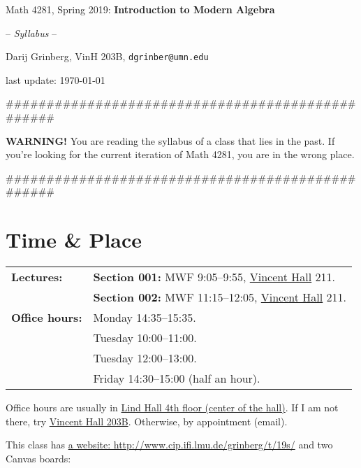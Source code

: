 \documentclass[numbers=enddot,12pt,final,onecolumn,notitlepage]{scrartcl}%
\theoremstyle{definition}
\newenvironment{noncompile}{}{}
\begin{document}
\begin{center}
Math 4281, Spring 2019: \textbf{Introduction to Modern Algebra}

-- \textit{Syllabus} --

Darij Grinberg, VinH 203B, \texttt{dgrinber@umn.edu}

last update: \today

\end{center}

\bigskip

\#\#\#\#\#\#\#\#\#\#\#\#\#\#\#\#\#\#\#\#\#\#\#\#\#\#\#\#\#\#\#\#\#\#\#\#\#\#\#\#\#\#\#\#\#\#\#\#\#

\textbf{WARNING!} You are reading the syllabus of a class that lies in the
past. If you're looking for the current iteration of Math 4281, you are in the
wrong place.

\#\#\#\#\#\#\#\#\#\#\#\#\#\#\#\#\#\#\#\#\#\#\#\#\#\#\#\#\#\#\#\#\#\#\#\#\#\#\#\#\#\#\#\#\#\#\#\#\#

\bigskip

\section{Time \& Place}%

\begin{tabular}
[c]{|ll|}\hline
\textbf{Lectures:} & \textbf{Section 001:} MWF 9:05--9:55,
\href{http://campusmaps.umn.edu/vincent-hall}{Vincent Hall} 211.\\
& \textbf{Section 002:} MWF 11:15--12:05,
\href{http://campusmaps.umn.edu/vincent-hall}{Vincent Hall} 211.\\\hline
\textbf{Office hours:} & Monday 14:35--15:35.\\
& Tuesday 10:00--11:00.\\
& Tuesday 12:00--13:00.\\
& Friday 14:30--15:00 (half an hour).\\\hline
\end{tabular}


\begin{noncompile}
\vspace{0.1cm}Office hours are usually in
\href{http://campusmaps.umn.edu/lind-hall}{Lind Hall 4th floor (center of the
hall)}. If I am not there, try
\href{http://campusmaps.umn.edu/vincent-hall}{Vincent Hall 203B}. Otherwise,
by appointment (email).
\end{noncompile}

\bigskip

This class has \href{http://www.cip.ifi.lmu.de/~grinberg/t/19s/}{a website:
http://www.cip.ifi.lmu.de/grinberg/t/19s/} and two Canvas boards:
\end{document}
